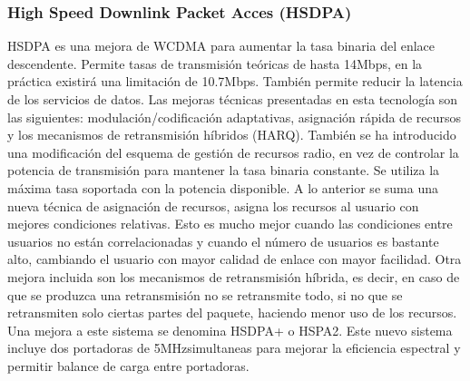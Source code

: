 \subsubsection{High Speed Downlink Packet Acces (HSDPA)}
\label{ssub:HSDPA}
HSDPA es una mejora de WCDMA para aumentar la tasa binaria del enlace descendente. Permite tasas de transmisión teóricas de hasta 14Mbps, en la práctica existirá una limitación de 10.7Mbps. También permite reducir la latencia de los servicios de datos. Las mejoras técnicas presentadas en esta tecnología son las siguientes: modulación/codificación adaptativas, asignación rápida de recursos y los mecanismos de retransmisión híbridos (HARQ). También se ha introducido una modificación del esquema de gestión de recursos radio, en vez de controlar la potencia de transmisión para mantener la tasa binaria constante. Se utiliza la máxima tasa soportada con la potencia disponible. A lo anterior se suma una nueva técnica de asignación de recursos, asigna los recursos al usuario con mejores condiciones relativas. Esto es mucho mejor cuando las condiciones entre usuarios no están correlacionadas y cuando el número de usuarios es bastante alto, cambiando el usuario con mayor calidad de enlace con mayor facilidad. Otra mejora incluida son los mecanismos de retransmisión híbrida, es decir, en caso de que se produzca una retransmisión no se retransmite todo, si no que se retransmiten solo ciertas partes del paquete, haciendo menor uso de los recursos.\\
Una mejora a este sistema se denomina HSDPA+ o HSPA2. Este nuevo sistema incluye dos portadoras de 5MHzsimultaneas para mejorar la eficiencia espectral y permitir balance de carga entre portadoras.
